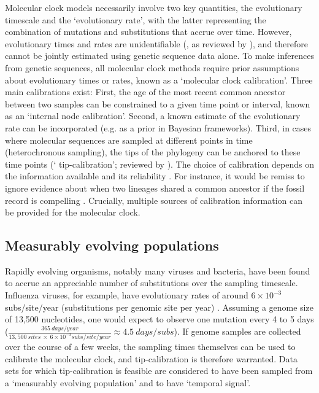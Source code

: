 \documentclass[11pt]{article}
\begin{document}
Molecular clock models necessarily involve two key quantities, the evolutionary timescale and the `evolutionary rate', with the latter representing the combination of mutations and substitutions that accrue over time. However, evolutionary times and rates are unidentifiable (\cite{dos2013unbearable}, as reviewed by \citealt{bromham2018bayesian, guindon2020rates}), and therefore cannot be jointly estimated using genetic sequence data alone. To make inferences from genetic sequences, all molecular clock methods require prior assumptions about evolutionary times or rates, known as a `molecular clock calibration'. Three main calibrations exist: First, the age of the most recent common ancestor between two samples can be constrained to a given time point or interval, known as an `internal node calibration'. Second, a known estimate of the evolutionary rate can be incorporated (e.g. as a prior in Bayesian frameworks). Third, in cases where molecular sequences are sampled at different points in time (heterochronous sampling), the tips of the phylogeny can be anchored to these time points (` tip-calibration'; reviewed by \cite{rieux2016inferences}). The choice of calibration depends on the information available and its reliability \citep{warnock2012exploring, duchene2014impact}. For instance, it would be remiss to ignore evidence about when two lineages shared a common ancestor if the fossil record is compelling \citep{gavryushkina2017bayesian, ronquist2016closing}. Crucially, multiple sources of calibration information can be provided for the molecular clock.

\subsection{Measurably evolving populations}
Rapidly evolving organisms, notably many viruses and bacteria, have been found to accrue an appreciable number of substitutions over the sampling timescale. Influenza viruses, for example, have evolutionary rates of around $6\times10^{-3}$ subs/site/year (substitutions per genomic site per year) \citep{ghafari2022purifying, sanjuan2012molecular}. Assuming a genome size of 13,500 nucleotides, one would expect to observe one mutation every 4 to 5 days ($\frac{365\ days/year}{13,500\ sites\ \times\ 6\times10^{-3}subs/site/year}\approx4.5\ days/subs$). If genome samples are collected over the course of a few weeks, the sampling times themselves can be used to calibrate the molecular clock, and tip-calibration is therefore warranted. Data sets for which tip-calibration is feasible are considered to have been sampled from a `measurably evolving population' \citep{drummond2003measurably} and to have `temporal signal'. 
\end{document}
